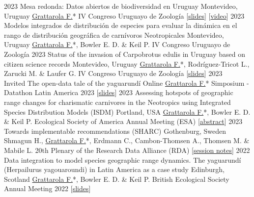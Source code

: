 \documentclass[9pt]{developercv} %
\begin{document}
\begin{entrylist}
	\entrylong
		{2023}
		{Mesa redonda: Datos abiertos de biodiversidad en Uruguay}
		{Montevideo, Uruguay}
		{\underline{Grattarola F.}* \slashsep IV Congreso Uruguayo de Zoología [\href{https://flograttarola.com/talk/datos-abiertos-de-biodiversidad-en-uruguay/Mesa_redonda_datos_abiertosCUZ2023.pdf}{slides}] [\href{https://youtu.be/3hzSsP84u88}{video}]}
	\entrylong
		{2023}
		{Modelos integrados de distribución de especies para evaluar la dinámica en el rango de distribución geográfica de carnívoros Neotropicales}
		{Montevideo, Uruguay}
		{\underline{Grattarola F.}*, Bowler E. D. \& Keil P. \slashsep IV Congreso Uruguayo de Zoología}
	\entrylong
		{2023}
		{Status of the invasion of Carpobrotus edulis in Uruguay based on citizen science records}
		{Montevideo, Uruguay}
		{\underline{Grattarola F.}*, Rodríguez-Tricot L., Zarucki M. \& Laufer G. \slashsep IV Congreso Uruguayo de Zoología [\href{https://flograttarola.com/talk/estatus-de-la-invasion-de-carpobrotus-edulis-en-uruguay-basado-en-registros-de-ciencia-ciudadana/Carpobrotus_edulis_CUZ2023.pdf}{slides}]}
		\entrylong
		{2023\\\footnotesize{Invited}}
		{The open-data tale of the yaguarundí}
		{Online}
		{\underline{Grattarola F.}* \slashsep Simposium - Datathon Latin America 2023 [\href{https://flograttarola.com/talk/el-cuento-del-yaguarundi-segun-los-datos-abiertos/simposio_DatatonLatam_2023.pdf}{slides}]}
		\entrylong
		{2023}
		{Assessing hotspots of geographic range changes for charismatic carnivores in the Neotropics using Integrated Species Distribution Models (ISDM)}
		{Portland, USA}
		{\underline{Grattarola F.}*, Bowler E. D. \& Keil P. \slashsep Ecological Society of America Annual Meeting (ESA) [\href{https://esa2023.eventscribe.net/fsPopup.asp?PresentationID=1276990&query=grattarola&Mode=presInfo}{abstract}]}
	\entrylong
		{2023}
		{Towards implementable recommendations (SHARC)}
		{Gothenburg, Sweden}
		{Shmagun H., \underline{Grattarola F.}*, Erdmann C., Cambon-Thomsen A., Thomsen M.  \& Mabile L. \slashsep 20th Plenary of the Research Data Alliance (RDA)  [\href{https://docs.google.com/document/d/1oQRp8EjHEOrmLj5QlqANM31q-AQa-CvJ804TRc9Re6I/edit?usp=sharing}{session notes}]}
	\entrylong
		{2022}
		{Data integration to model species geographic range dynamics. The yaguarundí (Herpailurus yagouaroundi) in Latin America as a case study}
		{Edinburgh, Scotland}
		{\underline{Grattarola F.}*, Bowler E. D. \& Keil P. \slashsep British Ecological Society Annual Meeting 2022 [\href{https://flograttarola.com/pdf/Grattarola_BES2022_short.pdf}{slides}]}

\end{entrylist}
\end{document}
